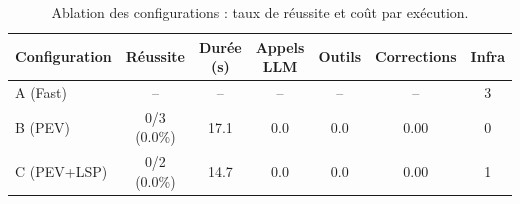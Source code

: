 \begin{table}[htbp]
\centering
\caption{Ablation des configurations : taux de réussite et coût par exécution.}
\label{tab:ablation}
\begin{tabular}{lcccccc}
\toprule
Configuration & Réussite & Durée (s) & Appels LLM & Outils & Corrections & Infra \\
\midrule
A (Fast) & -- & -- & -- & -- & -- & 3 \\
B (PEV) & 0/3 (0.0\%) & 17.1 & 0.0 & 0.0 & 0.00 & 0 \\
C (PEV+LSP) & 0/2 (0.0\%) & 14.7 & 0.0 & 0.0 & 0.00 & 1 \\
\bottomrule
\end{tabular}
\end{table}
